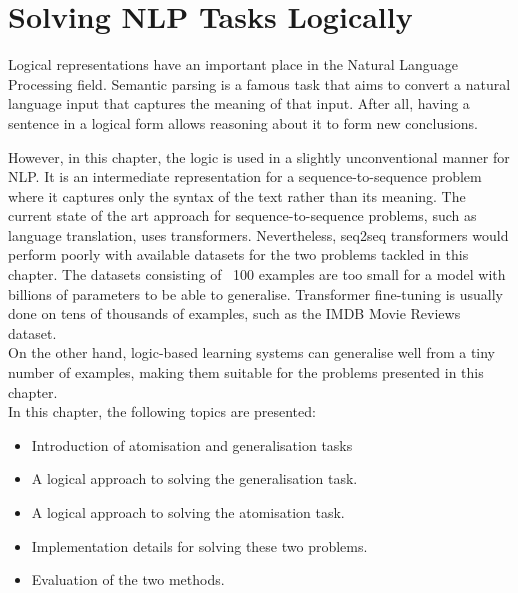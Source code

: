 


\chapter{Solving NLP Tasks Logically}
\label{solving-nlp-tasks-logically}


Logical representations have an important place in the Natural Language Processing field.
Semantic parsing \cite{RefWorks:RefID:28-jurafsky2014speech} is a famous task that aims to convert a natural language input that captures the meaning of that input.
After all, having a sentence in a logical form allows reasoning about it to form new conclusions.

However, in this chapter, the logic is used in a slightly unconventional manner for NLP.
It is an intermediate representation for a sequence-to-sequence problem where it captures only the syntax of the text rather than its meaning.
The current state of the art approach for sequence-to-sequence problems, such as language translation, uses transformers. 
Nevertheless, seq2seq transformers would perform poorly with available datasets for the two problems tackled in this chapter.
The datasets consisting of ~100 examples are too small for a model with billions of parameters to be able to generalise.
Transformer fine-tuning is usually done on tens of thousands of examples, such as the IMDB Movie Reviews dataset. \\
On the other hand, logic-based learning systems can generalise well from a tiny number of examples, making them suitable for the problems presented in this chapter. \\


In this chapter, the following topics are presented:
\begin{itemize}
    \item Introduction of atomisation and generalisation tasks
    \item A logical approach to solving the generalisation task.
    \item A logical approach to solving the atomisation task.
    \item Implementation details for solving these two problems.
    \item Evaluation of the two methods.
\end{itemize}



